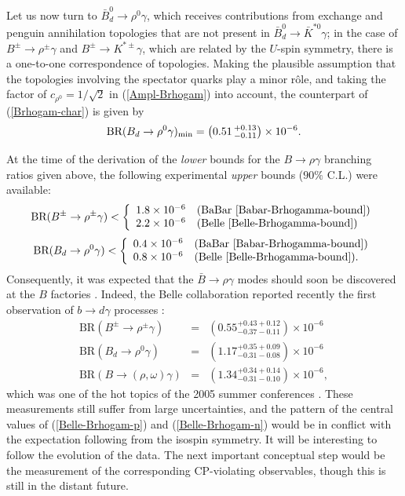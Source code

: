 \documentclass[11pt]{cernrep}
\begin{document}
Let us now turn to $\bar B^0_d\to\rho^0\gamma$, which receives 
contributions from exchange and penguin annihilation topologies that are 
not present in 
$\bar B^0_d\to \bar K^{\ast0}\gamma$; in the case of $B^\pm\to\rho^\pm\gamma$ 
and $B^\pm\to K^{\ast\pm}\gamma$, which are related by the $U$-spin symmetry, 
there is a one-to-one correspondence of topologies. Making the 
plausible assumption that the topologies involving the spectator quarks play 
a minor r\^ole, and taking the factor of $c_{\rho^0}=1/\sqrt{2}$ in 
(\ref{Ampl-Brhogam}) into account, the counterpart of (\ref{Brhogam-char}) 
is given by 
\begin{equation}\label{Brhogam-neut}
\mbox{BR}(B_d\to \rho^0\gamma)_{\rm min}=\left(0.51\,^{+0.13}_{-0.11}
\right)\times10^{-6}.
\end{equation}

At the time of the derivation of the {\it lower} bounds for the
$B\to\rho\gamma$ branching ratios given above, the following experimental {\it upper}
bounds ($90\%$ C.L.) were available:
\begin{equation}\label{Brho-gam-char-EXP}
\mbox{BR}(B^\pm\to \rho^\pm\gamma)<\left\{\begin{array}{ll}
1.8\times 10^{-6} & \mbox{(BaBar \cite{Babar-Brhogamma-bound})}\\
2.2\times 10^{-6} & \mbox{(Belle \cite{Belle-Brhogamma-bound})}\\
\end{array} \right.
\end{equation}
\begin{equation}\label{Brho-gam-neut-EXP}
\mbox{BR}(B_d\to \rho^0\gamma)<\left\{\begin{array}{ll}
0.4\times 10^{-6} & \mbox{(BaBar \cite{Babar-Brhogamma-bound})}\\
0.8\times 10^{-6} & \mbox{(Belle \cite{Belle-Brhogamma-bound}).}
\end{array} \right.
\end{equation}
Consequently, it was expected that the $\bar B\to\rho\gamma$ modes should 
soon be discovered at the $B$ factories \cite{FR2}. Indeed, the Belle 
collaboration reported recently the first observation of $b\to d\gamma$ processes
\cite{Belle-bdgam-obs}:
\begin{eqnarray}
\mbox{BR}(B^\pm\to \rho^\pm\gamma)&=&\left(0.55^{+0.43+0.12}_{-0.37-0.11}\right)
\times 10^{-6}
\label{Belle-Brhogam-p}\\
\mbox{BR}(B_d\to \rho^0\gamma)&=&\left(1.17^{+0.35+0.09}_{-0.31-0.08}\right)
\times 10^{-6}
\label{Belle-Brhogam-n}\\
\mbox{BR}(B\to(\rho,\omega)\gamma)&=&
\left(1.34^{+0.34+0.14}_{-0.31-0.10}\right)\times 10^{-6},
\end{eqnarray}
which was one of the hot topics of the 2005 summer conferences \cite{Belle-press}.
These measurements still suffer from large uncertainties, and the pattern of the 
central values of (\ref{Belle-Brhogam-p}) and (\ref{Belle-Brhogam-n}) would be in
conflict with the expectation following from the isospin symmetry. It will be interesting
to follow the evolution of the data. The next important conceptual step would be the measurement of the corresponding CP-violating observables, though
 this is still
in the distant future.
\end{document}
